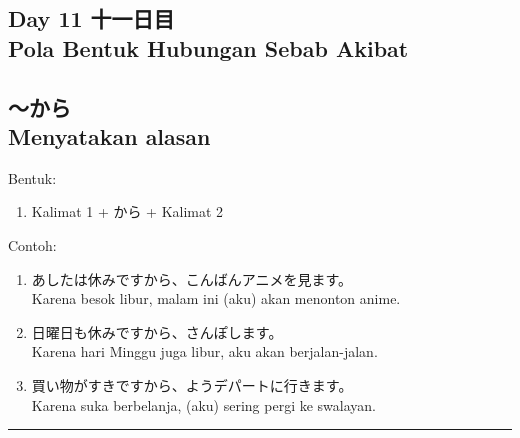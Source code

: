\begin{flushright}
    \section*{\Large{Day 11 十一日目 \\
    Pola Bentuk Hubungan Sebab Akibat}}
\end{flushright}

\subsection*{
    ～から \\ 
    Menyatakan alasan
}
Bentuk:
\begin{enumerate}
    \item Kalimat 1 + から + Kalimat 2
\end{enumerate}
Contoh: 
\begin{enumerate}
    \item あしたは休みですから、こんばんアニメを見ます。
    \\ Karena besok libur, malam ini (aku) akan menonton anime.
    \item 日曜日も休みですから、さんぽします。
    \\ Karena hari Minggu juga libur, aku akan berjalan-jalan.
    \item 買い物がすきですから、ようデパートに行きます。
    \\ Karena suka berbelanja, (aku) sering pergi ke swalayan.
\end{enumerate}

\vspace{0.2cm}\hrule height 1pt\vspace{0.2cm}


